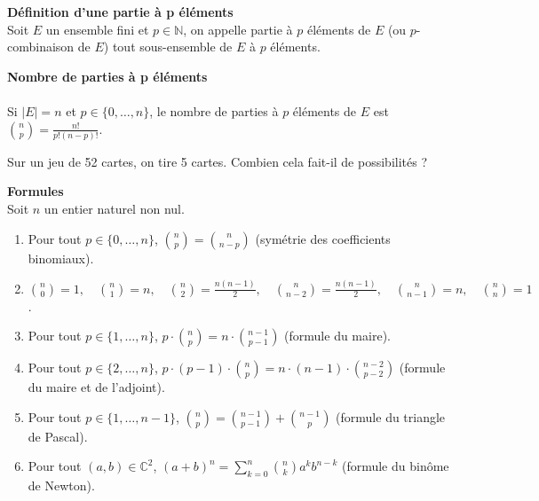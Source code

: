 \documentclass[../PolyS4.tex]{subfiles}
\begin{document}
\begin{Def}\textbf{Définition d'une partie à p éléments}\\
Soit \( E \) un ensemble fini et \( p \in \mathbb{N} \), on appelle partie à \( p \) éléments de \( E \) (ou \( p \)-combinaison de \( E \)) tout sous-ensemble de \( E \) à \( p \) éléments.\\
\end{Def}

\begin{Prop}\textbf{Nombre de parties à p éléments}\\
\\  Si \( |E| = n \) et \( p \in \{0, \ldots, n\} \), le nombre de parties à \( p \) éléments de \( E \) est \( \binom{n}{p} = \frac{n!}{p!(n - p)!} \).\\
\end{Prop}



\begin{Ex} 
Sur un jeu de 52 cartes, on tire 5 cartes. Combien cela fait-il de possibilités ?\\
\end{Ex}

\begin{Prop}\textbf{Formules}\\
Soit \( n \) un entier naturel non nul.\\
\begin{enumerate}
    \item Pour tout \( p \in \{0, \ldots, n\} \), \( \binom{n}{p} = \binom{n}{n - p} \) (symétrie des coefficients binomiaux).
    \item \( \binom{n}{0} = 1, \quad \binom{n}{1} = n, \quad \binom{n}{2} = \frac{n(n - 1)}{2}, \quad \binom{n}{n - 2} = \frac{n(n - 1)}{2}, \quad \binom{n}{n - 1} = n, \quad \binom{n}{n} = 1 \).
    \item Pour tout \( p \in \{1, \ldots, n\} \), \( p \cdot \binom{n}{p} = n \cdot \binom{n - 1}{p - 1} \) (formule du maire).
    \item Pour tout \( p \in \{2, \ldots, n\} \), \( p \cdot (p - 1) \cdot \binom{n}{p} = n \cdot (n - 1) \cdot \binom{n - 2}{p - 2} \) (formule du maire et de l'adjoint).
    \item Pour tout \( p \in \{1, \ldots, n - 1\} \), \( \binom{n}{p} = \binom{n - 1}{p - 1} + \binom{n - 1}{p} \) (formule du triangle de Pascal).
    \item Pour tout \( (a, b) \in \mathbb{C}^2 \), \( (a + b)^n = \sum_{k = 0}^{n} \binom{n}{k} a^k b^{n - k} \) (formule du binôme de Newton).\\
\end{enumerate}
\end{Prop}
\end{document}
